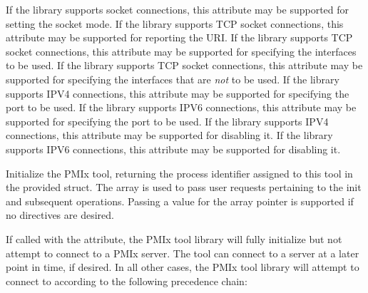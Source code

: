  If the library supports socket connections, this attribute may be supported for setting the socket mode.
\pasteAttributeItemEnd{}
 If the library supports TCP socket connections, this attribute may be supported for reporting the URI.
\pastePRIAttributeItemEnd{}
 If the library supports TCP socket connections, this attribute may be supported for specifying the interfaces to be used.
\pastePRIAttributeItemEnd{}
 If the library supports TCP socket connections, this attribute may be supported for specifying the interfaces that are \textit{not} to be used.
\pastePRIAttributeItemEnd{}
 If the library supports IPV4 connections, this attribute may be supported for specifying the port to be used.
\pastePRIAttributeItemEnd{}
 If the library supports IPV6 connections, this attribute may be supported for specifying the port to be used.
\pastePRIAttributeItemEnd{}
 If the library supports IPV4 connections, this attribute may be supported for disabling it.
\pastePRIAttributeItemEnd{}
 If the library supports IPV6 connections, this attribute may be supported for disabling it.
\pastePRIAttributeItemEnd{}

\optattrend

\descr

Initialize the \ac{PMIx} tool, returning the process identifier assigned to this tool in the provided  struct. The  array is used to pass user requests pertaining to the init and subsequent operations. Passing a  value for the array pointer is supported if no directives are desired.

If called with the  attribute, the \ac{PMIx} tool library will fully initialize but not attempt to connect to a \ac{PMIx} server. The tool can connect to a server at a later point in time, if desired. In all other cases, the \ac{PMIx} tool library will attempt to connect to according to the following precedence chain:

